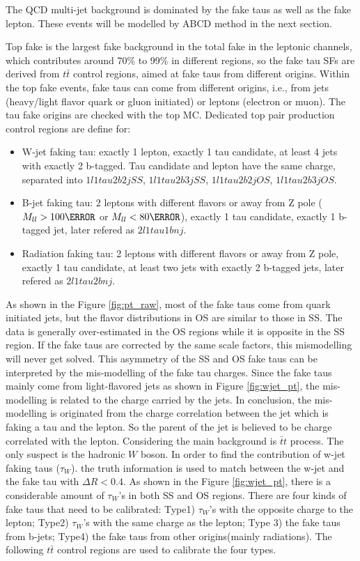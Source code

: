 The QCD multi-jet background is dominated by the fake taus as well as the fake lepton. These events will be modelled by ABCD method in the next section.

Top fake is the largest fake background in the total fake in the leptonic channels, which contributes around 70\% to 99\% in different regions, so the fake tau SFs are derived from $t\bar{t}$ control regions, aimed at fake taus from different origins.
Within the top fake events, fake taus can come from different origins, i.e., from jets (heavy/light flavor quark or gluon initiated) or leptons (electron or muon). The tau fake origins are checked with the top MC. Dedicated top pair production control regions are define for:
\begin{itemize}
\item{W-jet faking tau: exactly 1 lepton, exactly 1 tau candidate, at least 4 jets with exactly 2 b-tagged. Tau candidate and lepton have the same charge, separated into $1l1tau2b2j SS$, $1l1tau2b3j SS$, $1l1tau2b2j OS$, $1l1tau2b3j OS$.}
\item{B-jet faking tau: 2 leptons with different flavors or away from Z pole ($M_{ll}>100\GeV$ or $M_{ll}<80\GeV$), exactly 1 tau candidate, exactly 1 b-tagged jet, later refered as $2l1tau1bnj$.}
\item{Radiation faking tau: 2 leptons with different flavors or away from Z pole, exactly 1 tau candidate, at least two jets with exactly 2 b-tagged jets, later refered as $2l1tau2bnj$.}
\end{itemize}



As shown in the Figure \ref{fig:pt_raw}, most of the fake taus come from quark initiated jets, but the flavor distributions in OS are similar to those in SS. The data is generally over-estimated in the OS regions while it is opposite in the SS region. If the fake taus are corrected by the same scale factors, this mismodelling will never get solved. This asymmetry of the SS and OS fake taus can be interpreted by the mis-modelling of the fake tau charges. Since the fake taus mainly come from light-flavored jets as shown in Figure \ref{fig:wjet_pt}, the mis-modelling is related to the charge carried by the jets. In conclusion, the mis-modelling is originated from the charge correlation between the jet which is faking a tau and the lepton. So the parent of the jet is believed to be charge correlated with the lepton. Considering the main background is $\bar{t}t$ process. The only suspect is the hadronic $W$ boson. In order to find the contribution of w-jet faking taus ($\tau_{W}$).  the truth information is used to match between the w-jet and the fake tau with $\Delta R < 0.4$. As shown in the Figure \ref{fig:wjet_pt}, there is a considerable amount of $\tau_{W}$'s in both SS and OS regions. There are four kinds of fake taus that need to be calibrated: Type1) $\tau_{W}$'s with the opposite charge to the lepton; Type2) $\tau_{W}$'s with the same charge as the lepton; Type 3) the fake taus from b-jets; Type4) the fake taus from other origins(mainly radiations). The following
$t\bar t$ control regions are used to calibrate the four types.

